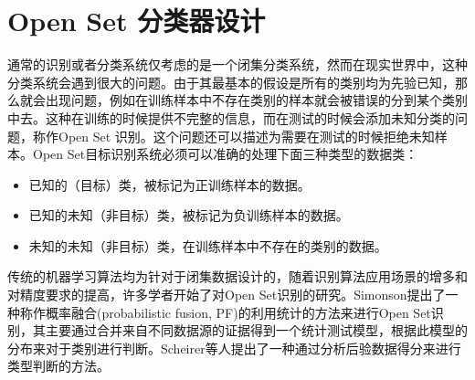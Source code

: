 \section{Open Set 分类器设计}
通常的识别或者分类系统仅考虑的是一个闭集分类系统，然而在现实世界中，这种分类系统会遇到很大的问题。由于其最基本的假设是所有的类别均为先验已知，那么就会出现问题，例如在训练样本中不存在类别的样本就会被错误的分到某个类别中去。这种在训练的时候提供不完整的信息，而在测试的时候会添加未知分类的问题，称作Open Set 识别。这个问题还可以描述为需要在测试的时候拒绝未知样本。Open Set目标识别系统必须可以准确的处理下面三种类型的数据类：
\begin{itemize}
	\item 已知的（目标）类，被标记为正训练样本的数据。
	\item 已知的未知（非目标）类，被标记为负训练样本的数据。
	\item 未知的未知（非目标）类，在训练样本中不存在的类别的数据。
\end{itemize}
传统的机器学习算法均为针对于闭集数据设计的，随着识别算法应用场景的增多和对精度要求的提高，许多学者开始了对Open Set识别的研究。Simonson提出了一种称作概率融合(probabilistic fusion, PF)的利用统计的方法来进行Open Set识别，其主要通过合并来自不同数据源的证据得到一个统计测试模型，根据此模型的分布来对于类别进行判断。Scheirer等人提出了一种通过分析后验数据得分来进行类型判断的方法。


